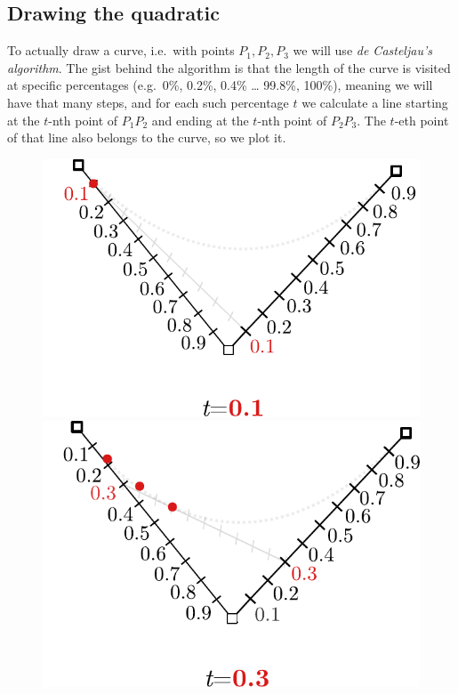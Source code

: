 \documentclass[12pt,openany,a4,usenames,dvipsnames]{book}
\begin{document}
\subsection{Drawing the quadratic}
To actually draw a curve, i.e.\ with points $P_1,P_2,P_3$ we will use \emph{de Casteljau's algorithm}. The gist behind the algorithm is that the length of the curve is visited at specific percentages (e.g.\ 0\%, 0.2\%, 0.4\% \ldots{} 99.8\%, 100\%), meaning we will have that many steps, and for each such percentage $t$ we calculate a line starting at the $t$-nth point of $P_{1}P_{2}$ and ending at the $t$-nth point of $P_{2}P_{3}$. The $t$-eth point of that line also belongs to the curve, so we plot it.
\begin{figure}[H]
  \centering
  \begin{minipage}{0.49\textwidth}
    \includegraphics[width=\textwidth,keepaspectratio]{figures/bezier_step_0.1.pdf}
  \end{minipage}
  \hspace{.1em}
  \begin{minipage}{0.49\textwidth}
    \includegraphics[width=\textwidth,keepaspectratio]{figures/bezier_step_0.3.pdf}

\end{minipage}
\end{figure}
\end{document}
